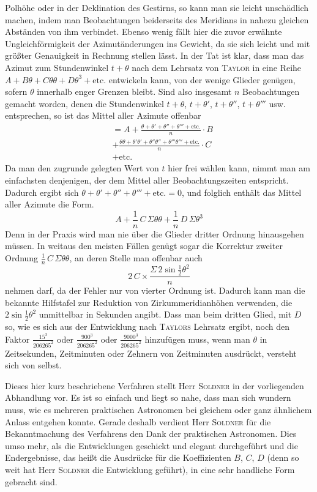 Polhöhe oder in der Deklination des Gestirns, so kann man sie leicht unschädlich machen, indem man Beobachtungen beiderseits des Meridians in nahezu gleichen Abständen von ihm verbindet. Ebenso wenig fällt hier die zuvor erwähnte Ungleichförmigkeit der Azimutänderungen ins Gewicht, da sie sich leicht und mit größter Genauigkeit in Rechnung stellen lässt. In der Tat ist klar, dass man das Azimut zum Stundenwinkel $t+\theta$ nach dem Lehrsatz von \textsc{Taylor} in eine Reihe $A+B\theta+C\theta\theta+D\theta^3+\text{etc.}$ entwickeln kann, von der wenige Glieder genügen, sofern $\theta$ innerhalb enger Grenzen bleibt. Sind also insgesamt $n$ Beobachtungen gemacht worden, denen die Stundenwinkel $t+\theta$, $t+\theta'$, $t+\theta''$, $t+\theta'''$ usw. entsprechen, so ist das Mittel aller Azimute offenbar
\[
\begin{aligned}&= A + \frac{\theta+\theta'+\theta''+\theta'''+\text{etc.}}{n}\cdot B\\[3pt]
&+ \frac{\theta\theta+\theta'\theta'+\theta''\theta''+\theta'''\theta'''+\text{etc.}}{n}\cdot C\\[3pt]
&+ \text{etc.}\end{aligned}
\]
Da man den zugrunde gelegten Wert von $t$ hier frei wählen kann, nimmt man am einfachsten denjenigen, der dem Mittel aller Beobachtungszeiten entspricht. Dadurch ergibt sich $\theta+\theta'+\theta''+\theta'''+\text{etc.}=0$, und folglich enthält das Mittel aller Azimute die Form.
\[
A + \frac{1}{n}\,C\,\Sigma\theta\theta + \frac{1}{n}\,D\,\Sigma\theta^3
\]
Denn in der Praxis wird man nie über die Glieder dritter Ordnung hinausgehen müssen. In weitaus den meisten Fällen genügt sogar die Korrektur zweiter Ordnung $\frac{1}{n}\,C\,\Sigma\theta\theta$, an deren Stelle man offenbar auch
\[
2\,C \times \frac{\Sigma\,2\sin\frac{1}{2}\theta^2}{n}
\]
nehmen darf, da der Fehler nur von vierter Ordnung ist. Dadurch kann man die bekannte Hilfstafel zur Reduktion von Zirkummeridianhöhen verwenden, die $2\sin\frac{1}{2}\theta^2$ unmittelbar in Sekunden angibt. Dass man beim dritten Glied, mit $D$ so, wie es sich aus der Entwicklung nach \textsc{Taylors} Lehrsatz ergibt, noch den Faktor $\frac{15^3}{206265^2}$ oder $\frac{900^3}{206265^2}$ oder $\frac{9000^3}{206265^2}$ hinzufügen muss, wenn man $\theta$ in Zeitsekunden, Zeitminuten oder Zehnern von Zeitminuten ausdrückt, versteht sich von selbst.

Dieses hier kurz beschriebene Verfahren stellt Herr \textsc{Soldner} in der vorliegenden Abhandlung vor. Es ist so einfach und liegt so nahe, dass man sich wundern muss, wie es mehreren praktischen Astronomen bei gleichem oder ganz ähnlichem Anlass entgehen konnte. Gerade deshalb verdient Herr \textsc{Soldner} für die Bekanntmachung des Verfahrens den Dank der praktischen Astronomen. Dies umso mehr, als die Entwicklungen geschickt und elegant durchgeführt und die Endergebnisse, das heißt die Ausdrücke für die Koeffizienten $B$, $C$, $D$ (denn so weit hat Herr \textsc{Soldner} die Entwicklung geführt), in eine sehr handliche Form gebracht sind.

